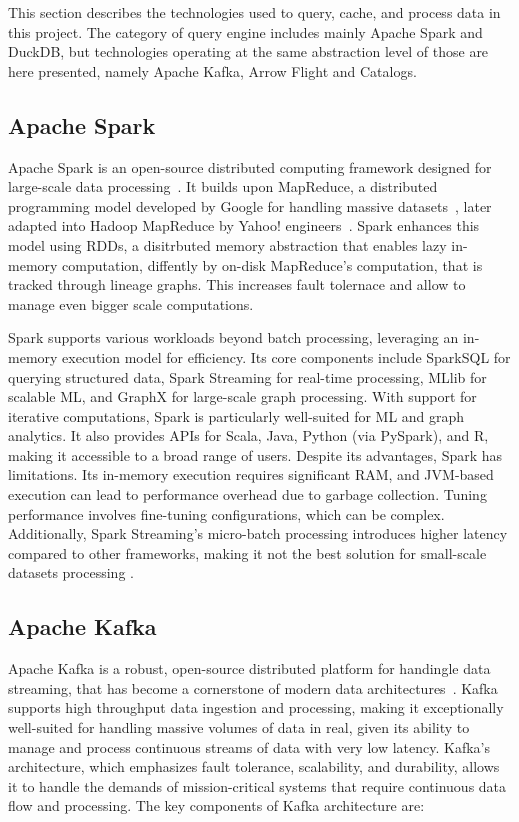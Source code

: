 This section describes the technologies used to query, cache, and process data in this project. The category of query engine includes mainly Apache Spark and DuckDB, but technologies operating at the same abstraction level of those are here presented, namely Apache Kafka, Arrow Flight and Catalogs.

\subsection{Apache Spark}
Apache Spark is an open-source distributed computing framework designed for large-scale data processing~\cite{zahariaApacheSparkUnified2016}. It builds upon MapReduce, a distributed programming model developed by Google for handling massive datasets~\cite{dean2004mapreduce}, later adapted into Hadoop MapReduce by Yahoo! engineers~\cite{borthakurHadoopDistributedFile2005}. Spark enhances this model using \glspl{RDD}\cite{Zaharia:EECS-2011-82}, a disitrbuted memory abstraction that enables lazy in-memory computation, diffently by on-disk MapReduce's computation, that is tracked through lineage graphs. This increases fault tolernace \cite{Zaharia:EECS-2011-82} and allow to manage even bigger scale computations.

Spark supports various workloads beyond batch processing, leveraging an in-memory execution model for efficiency. Its core components include SparkSQL for querying structured data, Spark Streaming for real-time processing, MLlib for scalable \gls{ML}, and GraphX for large-scale graph processing. With support for iterative computations, Spark is particularly well-suited for \gls{ML} and graph analytics. It also provides \glspl{API} for Scala, Java, Python (via PySpark), and R, making it accessible to a broad range of users. Despite its advantages, Spark has limitations. Its in-memory execution requires significant RAM, and \gls{JVM}-based execution can lead to performance overhead due to garbage collection. Tuning performance involves fine-tuning configurations, which can be complex. Additionally, Spark Streaming's micro-batch processing introduces higher latency compared to other frameworks, making it not the best solution for small-scale datasets processing \cite{BenchmarkResultsSpark}.

\subsection{Apache Kafka}
\label{subsec:back_apache_kafka}
Apache Kafka is a robust, open-source distributed platform for handingle data streaming, that has become a cornerstone of modern data architectures~\cite{krepsKafkaDistributedMessaging2011}. Kafka supports high throughput data ingestion and processing, making it exceptionally well-suited for handling massive volumes of data in real, given its ability to manage and process continuous streams of data with very low latency. Kafka's architecture, which emphasizes fault tolerance, scalability, and durability, allows it to handle the demands of mission-critical systems that require continuous data flow and processing.  The key components of Kafka architecture are:

